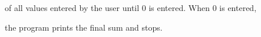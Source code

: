 of all values entered by the user until 0 is entered. When 0 is entered,

the program prints the final sum and stops.

